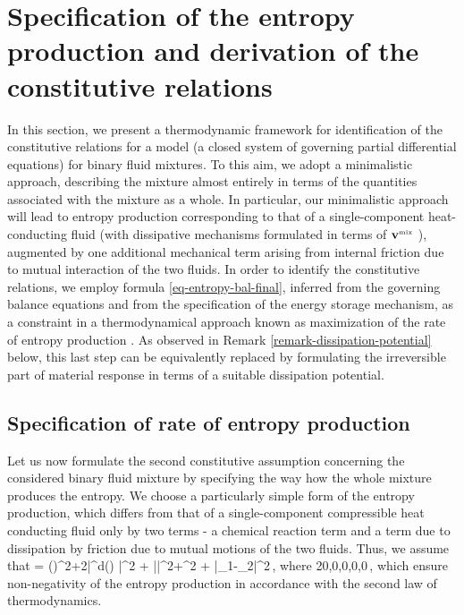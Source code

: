 \documentclass[a4paper]{article}
\begin{document}
\section{Specification of the entropy production and derivation of the constitutive relations}
\label{sec-constitutive}
In this section, we present a thermodynamic framework for identification of the constitutive relations for a model (a closed system of governing partial differential equations) for binary fluid mixtures. %
To this aim, we adopt a minimalistic approach, describing the mixture almost entirely in terms of the quantities associated with the mixture as a whole. In particular, our minimalistic approach will lead to entropy production corresponding to that of a single-component heat-conducting fluid (with dissipative mechanisms formulated in terms of ${\bf v}^{\mbox{\tiny{mix}}}$ ), augmented by one additional mechanical term arising from internal friction due to mutual interaction of the two fluids. In order to identify the constitutive relations, we employ formula \eqref{eq-entropy-bal-final}, inferred from the governing balance equations and from the specification of the energy storage mechanism, as a constraint in a thermodynamical approach known as maximization of the rate of entropy production \cite{Rajagopal-Srinivasa-2004}. As observed in Remark \ref{remark-dissipation-potential} below, this last step can be equivalently replaced by formulating the irreversible part of material response in terms of a suitable dissipation potential.


\subsection{Specification of rate of entropy production}
\label{sec-entrprod-ansatz}
Let us now formulate the second constitutive assumption concerning the considered binary fluid mixture by specifying the way how the whole mixture produces the entropy. We choose a particularly simple form of the entropy production, which differs from that of a single-component compressible heat conducting fluid\cite{Malek2016} only by two terms - a chemical reaction term and a term due to dissipation by friction due to mutual motions of the two fluids. Thus, we assume that 
\be
\label{eq:diss}
	\hat{\xi} = (\div\vvmix)^2+2\nu |\DD^d(\vvmix) |^2 + \kappa|\nabla\vartheta|^2+\beta\mu^2 + \alpha|\vv_{1}{-}\vv_2|^2\,,
\ee 
where
\lambda{+}2\nu{>}0,\quad\nu{>}0,\quad\kappa{>}0,\quad\beta{>}0,\quad\alpha{>}0\,,
\ee
which ensure non-negativity of the entropy production in accordance with the second law of thermodynamics.
\end{document}
